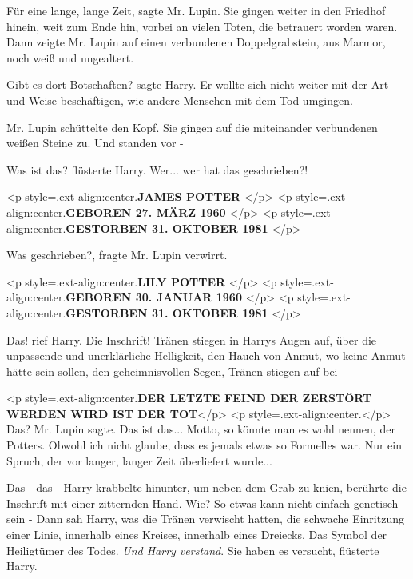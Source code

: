\glqq Für eine lange, lange Zeit\grqq{}, sagte Mr. Lupin. Sie gingen weiter in
den Friedhof hinein, weit zum Ende hin, vorbei an vielen Toten, die betrauert
worden waren. Dann zeigte Mr. Lupin auf einen verbundenen Doppelgrabstein, aus
Marmor, noch weiß und ungealtert.

\glqq Gibt es dort Botschaften?\grqq{} sagte Harry. Er wollte sich nicht weiter
mit der Art und Weise beschäftigen, wie andere Menschen mit dem Tod umgingen.

Mr. Lupin schüttelte den Kopf. Sie gingen auf die miteinander verbundenen weißen
Steine zu. Und standen vor -

\glqq Was ist das?\grqq{} flüsterte Harry. \glqq Wer... wer hat das
geschrieben?!\grqq{}

<p style=\grqq{}.ext-align:center\grqq{}.\textbf{JAMES POTTER }</p> <p
style=\grqq{}.ext-align:center\grqq{}.\textbf{GEBOREN 27. MÄRZ 1960 }</p> <p
style=\grqq{}.ext-align:center\grqq{}.\textbf{GESTORBEN 31. OKTOBER 1981 }</p>

\glqq Was geschrieben?\grqq{}, fragte Mr. Lupin verwirrt.

<p style=\grqq{}.ext-align:center\grqq{}.\textbf{LILY POTTER }</p> <p
style=\grqq{}.ext-align:center\grqq{}.\textbf{GEBOREN 30. JANUAR 1960 }</p> <p
style=\grqq{}.ext-align:center\grqq{}.\textbf{GESTORBEN 31. OKTOBER 1981 }</p>

\glqq Das!\grqq{} rief Harry. \glqq Die Inschrift!\grqq{} Tränen stiegen in
Harrys Augen auf, über die unpassende und unerklärliche Helligkeit, den Hauch
von Anmut, wo keine Anmut hätte sein sollen, den geheimnisvollen Segen, Tränen
stiegen auf bei

<p style=\grqq{}.ext-align:center\grqq{}.\textbf{DER LETZTE FEIND DER ZERSTÖRT
WERDEN WIRD IST DER TOT}</p> <p style=\grqq{}.ext-align:center\grqq{}.</p> \glqq
Das?\grqq{} Mr. Lupin sagte. \glqq Das ist das... Motto, so könnte man es wohl
nennen, der Potters. Obwohl ich nicht glaube, dass es jemals etwas so Formelles
war. Nur ein Spruch, der vor langer, langer Zeit überliefert wurde...\grqq{}

\glqq Das - das -\grqq{} Harry krabbelte hinunter, um neben dem Grab zu knien,
berührte die Inschrift mit einer zitternden Hand. \glqq Wie? So etwas kann nicht
einfach genetisch sein -\grqq{} Dann sah Harry, was die Tränen verwischt hatten,
die schwache Einritzung einer Linie, innerhalb eines Kreises, innerhalb eines
Dreiecks. Das Symbol der Heiligtümer des Todes. \emph{Und Harry verstand}. \glqq
Sie haben es versucht\grqq{}, flüsterte Harry.

